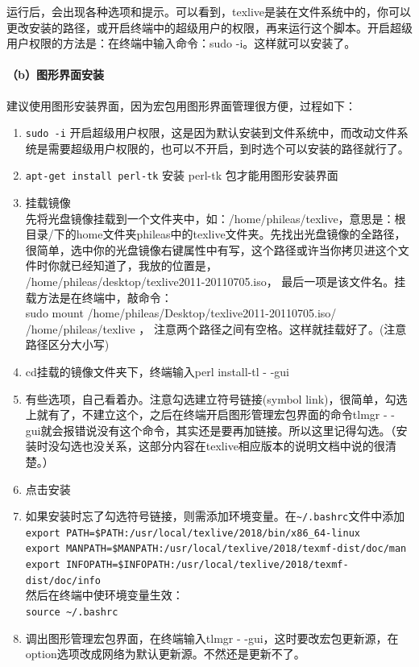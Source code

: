 运行后，会出现各种选项和提示。可以看到，texlive是装在文件系统中的，你可以更改安装的路径，或开启终端中的超级用户的权限，再来运行这个脚本。开启超级用户权限的方法是：在终端中输入命令：sudo -i。这样就可以安装了。

\paragraph{（b）图形界面安装}
建议使用图形安装界面，因为宏包用图形界面管理很方便，过程如下：
\begin{enumerate}
\item \verb*|sudo -i| 开启超级用户权限，这是因为默认安装到文件系统中，而改动文件系统是需要超级用户权限的，也可以不开启，到时选个可以安装的路径就行了。
\item  \verb*|apt-get install perl-tk| 安装 perl-tk 包才能用图形安装界面
\item 挂载镜像\\
先将光盘镜像挂载到一个文件夹中，如：/home/phileas/texlive，意思是：根目录/下的home文件夹phileas中的texlive文件夹。先找出光盘镜像的全路径，很简单，选中你的光盘镜像右键属性中有写，这个路径或许当你拷贝进这个文件时你就已经知道了，我放的位置是，\\
/home/phileas/desktop/texlive2011-20110705.iso，
最后一项是该文件名。挂载方法是在终端中，敲命令：\\
sudo mount /home/phileas/Desktop/texlive2011-20110705.iso/~~ /home/phileas/texlive ，
注意两个路径之间有空格。这样就挂载好了。(注意路径区分大小写)
\item cd挂载的镜像文件夹下，终端输入perl install-tl  - -gui
\item 有些选项，自己看着办。注意勾选建立符号链接(symbol link)，很简单，勾选上就有了，不建立这个，之后在终端开启图形管理宏包界面的命令tlmgr - - gui就会报错说没有这个命令，其实还是要再加链接。所以这里记得勾选。（安装时没勾选也没关系，这部分内容在texlive相应版本的说明文档中说的很清楚。）
\item 点击安装

\item 如果安装时忘了勾选符号链接，则需添加环境变量。在\verb|~/.bashrc|文件中添加\\
\verb|export PATH=$PATH:/usr/local/texlive/2018/bin/x86_64-linux|\\
\verb|export MANPATH=$MANPATH:/usr/local/texlive/2018/texmf-dist/doc/man|\\
\verb|export INFOPATH=$INFOPATH:/usr/local/texlive/2018/texmf-dist/doc/info|\\
然后在终端中使环境变量生效：\\
\verb|source ~/.bashrc|

\item 调出图形管理宏包界面，在终端输入tlmgr - -gui，这时要改宏包更新源，在option选项改成网络为默认更新源。不然还是更新不了。
\end{enumerate}


